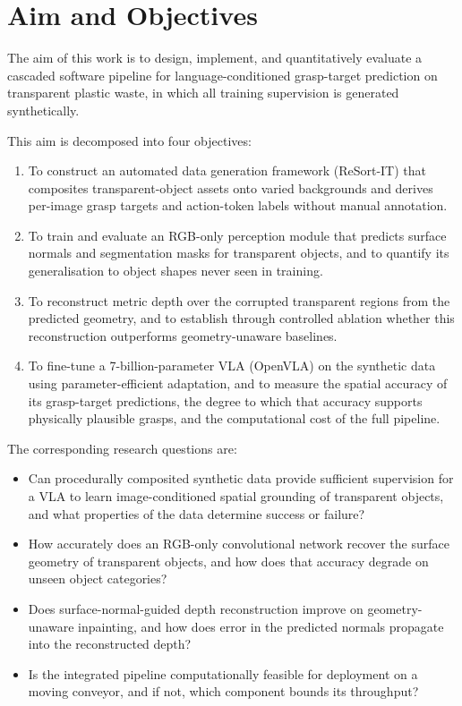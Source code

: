 \section{Aim and Objectives}
\label{sec:aims}

The aim of this work is to design, implement, and quantitatively evaluate a cascaded software pipeline for language-conditioned grasp-target prediction on transparent plastic waste, in which all training supervision is generated synthetically.

This aim is decomposed into four objectives:

\begin{enumerate}
    \item To construct an automated data generation framework (ReSort-IT) that composites transparent-object assets onto varied backgrounds and derives per-image grasp targets and action-token labels without manual annotation.
    \item To train and evaluate an RGB-only perception module that predicts surface normals and segmentation masks for transparent objects, and to quantify its generalisation to object shapes never seen in training.
    \item To reconstruct metric depth over the corrupted transparent regions from the predicted geometry, and to establish through controlled ablation whether this reconstruction outperforms geometry-unaware baselines.
    \item To fine-tune a 7-billion-parameter VLA (OpenVLA) on the synthetic data using parameter-efficient adaptation, and to measure the spatial accuracy of its grasp-target predictions, the degree to which that accuracy supports physically plausible grasps, and the computational cost of the full pipeline.
\end{enumerate}

The corresponding research questions are:

\begin{itemize}
    \item[\textbf{RQ1}] Can procedurally composited synthetic data provide sufficient supervision for a VLA to learn image-conditioned spatial grounding of transparent objects, and what properties of the data determine success or failure?
    \item[\textbf{RQ2}] How accurately does an RGB-only convolutional network recover the surface geometry of transparent objects, and how does that accuracy degrade on unseen object categories?
    \item[\textbf{RQ3}] Does surface-normal-guided depth reconstruction improve on geometry-unaware inpainting, and how does error in the predicted normals propagate into the reconstructed depth?
    \item[\textbf{RQ4}] Is the integrated pipeline computationally feasible for deployment on a moving conveyor, and if not, which component bounds its throughput?
\end{itemize}


